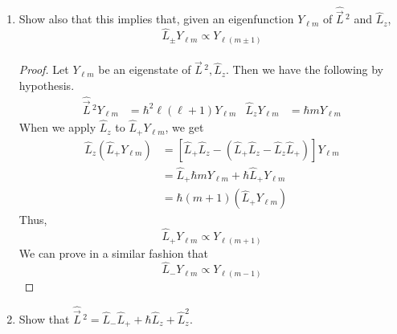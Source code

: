 \documentclass[../psets.tex]{subfiles}
\begin{document}
\begin{enumerate}
\begin{enumerate}
        \begin{proof}
            We have by the the commutator relations among the $\hat{L}_i$ that
            \begin{equation*}
                [\hat{L}_\pm,\hat{L}_z] = [\hat{L}_x\pm i\hat{L}_y,\hat{L}_z]
                = -i\hbar\hat{L}_y\pm i(i\hbar\hat{L}_x)
                = -i\hbar\hat{L}_y\mp\hbar\hat{L}_x
                = \mp\hbar(\hat{L}_x\pm i\hat{L}_y)
                = \mp\hbar\hat{L}_\pm
            \end{equation*}
            as desired.
        \end{proof}
        \item Show also that this implies that, given an eigenfunction $Y_{\ell m}$ of $\hat{\vec{L}}{\,}^2$ and $\hat{L}_z$,
        \begin{equation}
            \hat{L}_\pm Y_{\ell m} \propto Y_{\ell(m\pm 1)}
        \end{equation}
        \begin{proof}
            Let $Y_{\ell m}$ be an eigenstate of $\hat{\vec{L}}{\,}^2,\hat{L}_z$. Then we have the following by hypothesis.
            \begin{align*}
                \hat{\vec{L}}{\,}^2Y_{\ell m} &= \hbar^2\ell(\ell+1)Y_{\ell m}&
                \hat{L}_zY_{\ell m} &= \hbar mY_{\ell m}
            \end{align*}
            When we apply $\hat{L}_z$ to $\hat{L}_+Y_{\ell m}$, we get
            \begin{align*}
                \hat{L}_z(\hat{L}_+Y_{\ell m}) &= \left[ \hat{L}_+\hat{L}_z-(\hat{L}_+\hat{L}_z-\hat{L}_z\hat{L}_+) \right]Y_{\ell m}\\
                &= \hat{L}_+\hbar mY_{\ell m}+\hbar\hat{L}_+Y_{\ell m}\\
                &= \hbar(m+1)(\hat{L}_+Y_{\ell m})
            \end{align*}
            Thus,
            \begin{equation*}
                \hat{L}_+Y_{\ell m} \propto Y_{\ell(m+1)}
            \end{equation*}
            We can prove in a similar fashion that
            \begin{equation*}
                \hat{L}_-Y_{\ell m} \propto Y_{\ell(m-1)}
            \end{equation*}
        \end{proof}
        \item Show that $\hat{\vec{L}}{\,}^2=\hat{L}_-\hat{L}_++\hbar\hat{L}_z+\hat{L}_z^2$.

\end{enumerate}
\end{enumerate}
\end{document}
